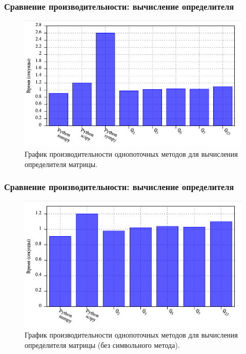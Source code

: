 \documentclass[10pt,professionalfont,utf8,presentation,compress]{beamer}
\theoremstyle{definition}
\theoremstyle{plain}
\begin{document}
\begin{frame}
\frametitle{Сравнение производительности: вычисление определителя}
\begin{figure}[H]
\centerline{\includegraphics[width=0.95\linewidth]{../gnuplot/single/det/plot.png}}
\caption{График производительности однопоточных методов для вычисления определителя матрицы.}
\label{img:single:det:1}
\end{figure}
\end{frame}


\begin{frame}
\frametitle{Сравнение производительности: вычисление определителя}
\begin{figure}[H]
\centerline{\includegraphics[width=0.95\linewidth]{../gnuplot/single/det/wosymb.png}}
\caption{График производительности однопоточных методов для вычисления определителя матрицы (без символьного метода).}
\label{img:single:det:2}
\end{figure}
\end{frame}
\end{document}
